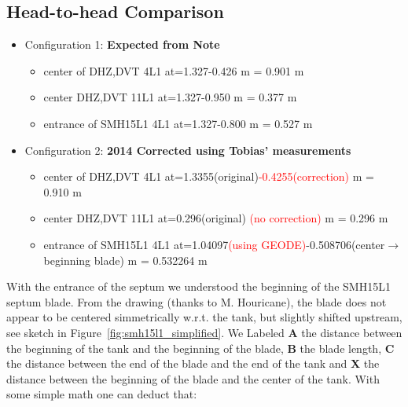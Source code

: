 \documentclass[11pt,letter,english]{article}
\begin{document}
\subsection*{Head-to-head Comparison}

\begin{itemize}

\item Configuration 1: {\bf Expected from Note}
  \begin{itemize}
  \item center of DHZ,DVT 4L1   at=1.327-0.426 m = 0.901 m 
  \item center DHZ,DVT 11L1     at=1.327-0.950 m = 0.377 m 
  \item entrance of SMH15L1 4L1 at=1.327-0.800 m = 0.527 m 
  \end{itemize}

\item Configuration 2: {\bf 2014 Corrected using Tobias' measurements}
  \begin{itemize}
  \item center of DHZ,DVT 4L1   at=1.3355(original)\textcolor{red}{-0.4255(correction)} m = 0.910 m 
  \item center DHZ,DVT 11L1     at=0.296(original) \textcolor{red}{(no correction)} m = 0.296 m 
  \item entrance of SMH15L1 4L1 at=1.04097\textcolor{red}{(using GEODE)}-0.508706(center$\to$beginning blade) m = 0.532264 m 
  \end{itemize}

\end{itemize}


With the entrance of the septum we understood the beginning of the SMH15L1
septum blade.  From the drawing (thanks to M. Houricane), the blade does not
appear to be centered simmetrically w.r.t. the tank, but slightly shifted
upstream, see sketch in Figure~\ref{fig:smh15l1_simplified}. We Labeled {\bf A}
the distance between the beginning of the tank and the beginning of the
blade, {\bf B} the blade length, {\bf C} the distance between the end of the
blade and the end of the tank and {\bf X} the distance between the beginning of
the blade and the center of the tank. With some simple math one can deduct that:
\end{document}
